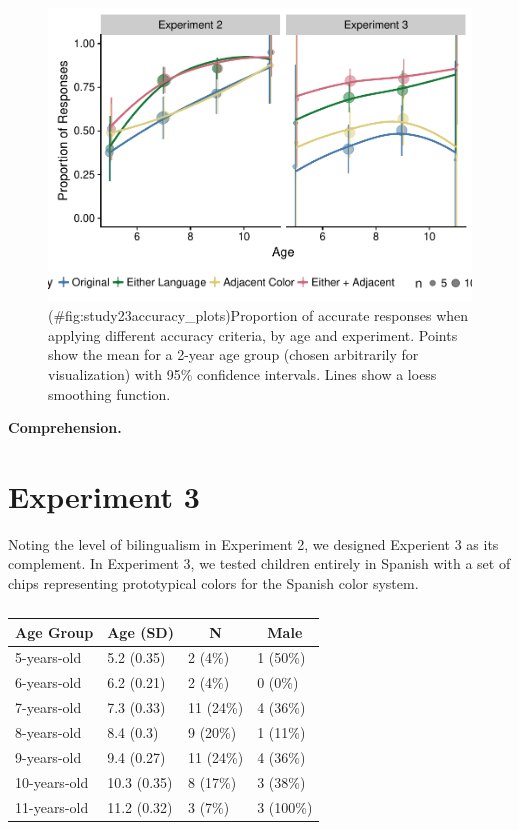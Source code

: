 \documentclass[floatsintext,man]{apa6}
\theoremstyle{definition}
\theoremstyle{definition}
\theoremstyle{definition}
\theoremstyle{remark}
\begin{document}
\begin{figure}
\centering
\includegraphics{amazon_color_files/figure-latex/study23accuracy_plots-1.pdf}
\caption{(\#fig:study23accuracy\_plots)Proportion of accurate responses
when applying different accuracy criteria, by age and experiment. Points
show the mean for a 2-year age group (chosen arbitrarily for
visualization) with 95\% confidence intervals. Lines show a loess
smoothing function.}
\end{figure}

\textbf{Comprehension.}

\section{Experiment 3}\label{experiment-3}

Noting the level of bilingualism in Experiment 2, we designed Experient
3 as its complement. In Experiment 3, we tested children entirely in
Spanish with a set of chips representing prototypical colors for the
Spanish color system.

\begin{table}[tbp]
\begin{center}
\begin{threeparttable}
\caption{\label{tab:unnamed-chunk-4}}
\begin{tabular}{llll}
\toprule
Age Group & \multicolumn{1}{c}{Age (SD)} & \multicolumn{1}{c}{N} & \multicolumn{1}{c}{Male}\\
\midrule
5-years-old & 5.2 (0.35) & 2 (4\%) & 1 (50\%)\\
6-years-old & 6.2 (0.21) & 2 (4\%) & 0 (0\%)\\
7-years-old & 7.3 (0.33) & 11 (24\%) & 4 (36\%)\\
8-years-old & 8.4 (0.3) & 9 (20\%) & 1 (11\%)\\
9-years-old & 9.4 (0.27) & 11 (24\%) & 4 (36\%)\\
10-years-old & 10.3 (0.35) & 8 (17\%) & 3 (38\%)\\
11-years-old & 11.2 (0.32) & 3 (7\%) & 3 (100\%)\\
\bottomrule
\end{tabular}
\end{threeparttable}
\end{center}
\end{table}
\end{document}
